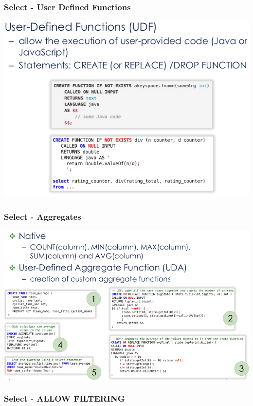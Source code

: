 \documentclass{article}
\begin{document}
\subsubsection{Select - User Defined Functions}

\begin{center}
  \includegraphics[scale=0.3]{33}
\end{center}

\pagebreak

\subsubsection{Select - Aggregates}

\begin{center}
  \includegraphics[scale=0.3]{34}
\end{center}

\subsubsection{Select - ALLOW FILTERING}
\end{document}
